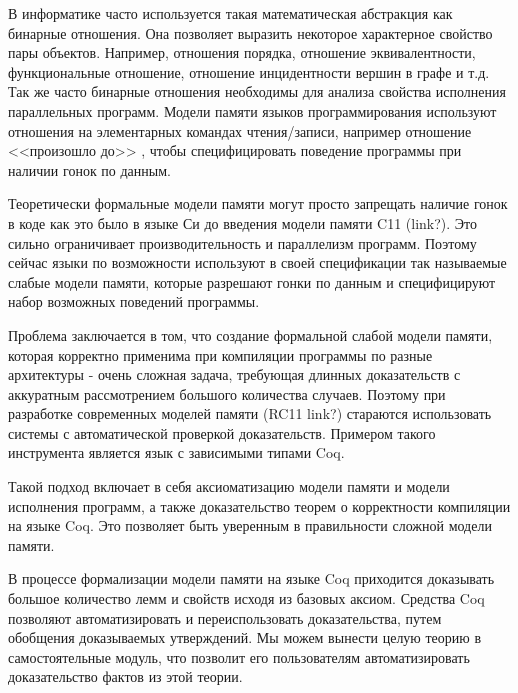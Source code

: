 \documentclass[times
              ]{itmo-student-thesis}
\begin{document}

\tableofcontents

\startprefacepage


 В информатике часто используется такая математическая абстракция как бинарные отношения.
Она позволяет выразить некоторое характерное свойство пары объектов. Например, отношения порядка, отношение эквивалентности, функциональные отношение, отношение инцидентности вершин в графе и т.д.
Так же часто бинарные отношения необходимы для анализа свойства исполнения параллельных программ. Модели памяти языков программирования используют отношения на элементарных командах чтения/записи, например отношение <<произошло до>> , чтобы специфицировать поведение программы при наличии гонок по данным.

Теоретически формальные модели памяти могут просто запрещать наличие гонок в коде как это было в языке Си до введения модели памяти C11 (link?). Это сильно ограничивает производительность и параллелизм программ. Поэтому сейчас языки по возможности используют в своей спецификации так называемые слабые модели памяти, которые разрешают гонки по данным и специфицируют набор возможных поведений программы.

Проблема заключается в том, что создание формальной слабой модели памяти, которая корректно применима при компиляции программы по разные архитектуры - очень сложная задача, требующая длинных доказательств с аккуратным рассмотрением большого количества случаев.
Поэтому при разработке современных моделей памяти (RC11 link?) стараются использовать системы с автоматической проверкой доказательств. Примером такого инструмента является язык с зависимыми типами Coq.

Такой подход включает в себя аксиоматизацию модели памяти и модели исполнения программ, а
также доказательство теорем о корректности компиляции на языке Coq. Это позволяет быть уверенным в правильности сложной модели памяти.

В процессе формализации модели памяти на языке Coq приходится доказывать большое количество лемм и свойств исходя из базовых аксиом. Средства Coq позволяют автоматизировать и переиспользовать доказательства, путем обобщения доказываемых утверждений. Мы можем вынести целую теорию в самостоятельные модуль, что позволит его пользователям автоматизировать доказательство фактов из этой теории.
\end{document}
